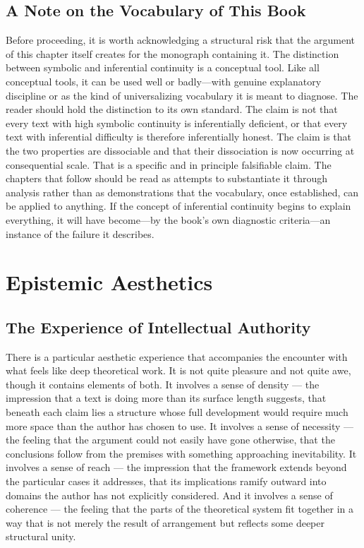 \documentclass[12pt, openright, twoside]{book}
\begin{document}
\section{A Note on the Vocabulary of This Book}

Before proceeding, it is worth acknowledging a structural risk that the
argument of this chapter itself creates for the monograph containing it. The
distinction between symbolic and inferential continuity is a conceptual tool.
Like all conceptual tools, it can be used well or badly---with genuine
explanatory discipline or as the kind of universalizing vocabulary it is
meant to diagnose. The reader should hold the distinction to its own standard.
The claim is not that every text with high symbolic continuity is inferentially
deficient, or that every text with inferential difficulty is therefore inferentially
honest. The claim is that the two properties are dissociable and that their
dissociation is now occurring at consequential scale. That is a specific and
in principle falsifiable claim. The chapters that follow should be read as
attempts to substantiate it through analysis rather than as demonstrations
that the vocabulary, once established, can be applied to anything. If the
concept of inferential continuity begins to explain everything, it will have
become---by the book's own diagnostic criteria---an instance of the failure
it describes.

\clearpage

\chapter{Epistemic Aesthetics}

\section{The Experience of Intellectual Authority}

There is a particular aesthetic experience that accompanies the encounter with
what feels like deep theoretical work. It is not quite pleasure and not quite
awe, though it contains elements of both. It involves a sense of density ---
the impression that a text is doing more than its surface length suggests, that
beneath each claim lies a structure whose full development would require much
more space than the author has chosen to use. It involves a sense of necessity
--- the feeling that the argument could not easily have gone otherwise, that the
conclusions follow from the premises with something approaching inevitability.
It involves a sense of reach --- the impression that the framework extends beyond
the particular cases it addresses, that its implications ramify outward into
domains the author has not explicitly considered. And it involves a sense of
coherence --- the feeling that the parts of the theoretical system fit together
in a way that is not merely the result of arrangement but reflects some deeper
structural unity.
\end{document}
